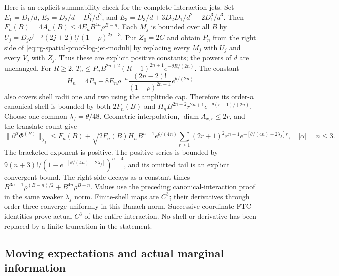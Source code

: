 Here is an explicit summability check for the complete interaction jets.
Set
\(E_1=D_1/d\), \(E_2=D_2/d+D_1^2/d^2\), and
\(E_3=D_3/d+3D_2D_1/d^2+2D_1^3/d^3\). Then
\(F_n(B)=4A_n(B)\le4E_nB^{4n}\rho^{B-n}\).
Each \(M_j\) is bounded over all \(B\) by
\(U_j=D_j\rho^{1-j}(2j+2)!/(1-\rho)^{2j+3}\).
Put \(Z_0=2C\) and obtain \(P_n\) from the right side of
\cref{eq:rg-spatial-proof-log-jet-moduli} by replacing every \(M_j\)
with \(U_j\) and every \(V_j\) with \(Z_j\). Thus these are explicit
positive constants; the powers of \(d\) are unchanged. For \(R\ge2\),
\(T_n\le P_nB^{2n+2}(R+1)^{2n+1}e^{-\theta R/(2n)}\).
The constant
\begin{equation}
 H_n=4P_n+
 8E_n\rho^{-n}\frac{(2n-2)!}{(1-\rho)^{2n-1}}e^{\theta/(2n)}
 \label{eq:rg-spatial-proof-jet-shell-constant}
\end{equation}
also covers shell radii one and two using the amplitude cap. Therefore
its order-\(n\) canonical shell is bounded by both \(2F_n(B)\) and
\(H_nB^{2n+2}r^{2n+1}e^{-\theta(r-1)/(2n)}\).
Choose one common \(\lambda_f=\theta/48\). Geometric interpolation,
\(\operatorname{diam}A_{x,r}\le2r\), and the translate count give
\begin{equation}
 \|\partial^\alpha\Phi^{(B)}\|_{\lambda_f}
 \le F_n(B)+\sqrt{2F_n(B)H_n}B^{n+1}e^{\theta/(4n)}
       \sum_{r\ge1}(2r+1)^2r^{n+1}
          e^{-[\theta/(4n)-2\lambda_f]r},\quad |\alpha|=n\le3.
 \label{eq:rg-spatial-proof-complete-jet-norm}
\end{equation}
The bracketed exponent is positive. The positive series is bounded by
\(9(n+3)!/(1-e^{-[\theta/(4n)-2\lambda_f]})^{n+4}\), and its
omitted tail is an explicit convergent bound. The right side decays as a
constant times \(B^{3n+1}\rho^{(B-n)/2}+B^{4n}\rho^{B-n}\).
Values use the preceding canonical-interaction proof in the same weaker
\(\lambda_f\) norm. Finite-shell maps are \(C^3\); their derivatives
through order three converge uniformly in this Banach norm. Successive
coordinate FTC identities prove actual \(C^3\) of the entire interaction.
No shell or derivative has been replaced by a finite truncation in the
statement.

\subsection{Moving expectations and actual marginal information}
\label{sec:rg-spatial-proof-moving-fisher}

